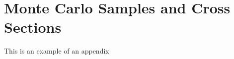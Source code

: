 \chapter{Monte Carlo Samples and Cross Sections}
\label{app:mcLists}

This is an example of an appendix
